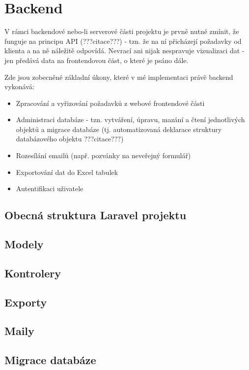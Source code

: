 \section{Backend}
	V rámci backendové nebo-li serverové části projektu je prvně nutné zmínit, že funguje na principu API (???citace???) - tzn. že na ní přicházejí požadavky od klienta a na ně náležitě odpovídá. Nevrací ani nijak nespravuje vizualizaci dat - jen předává data na frontendovou část, o které je psáno dále.
	
	Zde jsou zobecněné základní úkony, které v mé implementaci právě backend vykonává:
	\begin{itemize}
		\item Zpracování a vyřizování požadavků z webové frontendové části
		\item Administraci databáze - tzn. vytváření, úpravu, mazání a čtení jednotlivých objektů a migrace databáze (tj. automatizovaná deklarace struktury databázového objektu ???citace???)
		\item Rozesílání emailů (např. pozvánky na neveřejný formulář)
		\item Exportování dat do Excel tabulek
		\item Autentifikaci uživatele
	\end{itemize}
	 
	\subsection{Obecná struktura Laravel projektu}

	\subsection{Modely}
			
	\subsection{Kontrolery}
	
	\subsection{Exporty}
	
	\subsection{Maily}
	
	\subsection{Migrace databáze}
